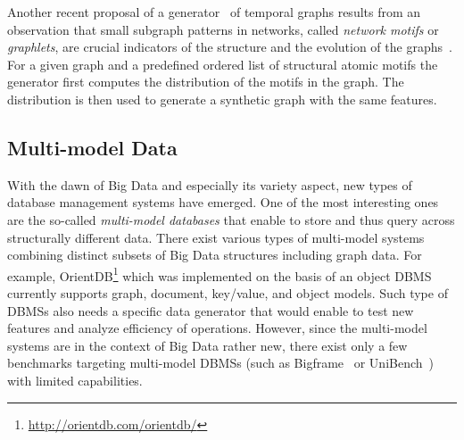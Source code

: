 Another recent proposal of a generator~\cite{mlg2018_42} of temporal graphs results from an observation that small subgraph patterns in networks, called \emph{network motifs} or \emph{graphlets}, are crucial indicators of the structure and the evolution of the graphs~\cite{Paranjape:2017:MTN:3018661.3018731}. For a given graph and a predefined ordered list of structural atomic motifs the generator first computes the distribution of the motifs in the graph. The distribution is then used to generate a synthetic graph with the same features.




\subsection{Multi-model Data}
With the dawn of Big Data and especially its variety aspect, new types of
database management systems have emerged. One of the most interesting ones
are the so-called \emph{multi-model databases} that enable to store and
thus query across structurally different data. There exist various types of
multi-model systems combining  distinct subsets of Big Data structures including graph data.
For example, OrientDB\footnote{\url{http://orientdb.com/orientdb/}} which was
implemented on the basis of an object DBMS currently supports graph, document,
key/value, and object models. Such type of DBMSs also needs a specific
data generator that would enable
to test new features and analyze efficiency of operations. However, since the
multi-model systems are in the context of Big Data rather new, there exist only
a few benchmarks targeting multi-model DBMSs (such as
Bigframe~\cite{journals/pvldb/KunjirKB14} or UniBench~\cite{conf/cidr/lu17})
with limited capabilities.



